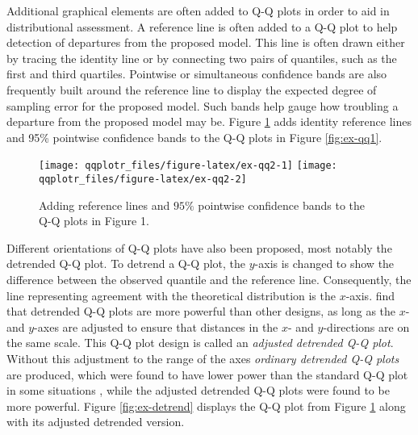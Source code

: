 Additional graphical elements are often added to Q-Q plots in order to
aid in distributional assessment. A reference line is often added to a
Q-Q plot to help detection of departures from the proposed model. This
line is often drawn either by tracing the identity line or by connecting
two pairs of quantiles, such as the first and third quartiles. Pointwise
or simultaneous confidence bands are also frequently built around the
reference line to display the expected degree of sampling error for the
proposed model. Such bands help gauge how troubling a departure from the
proposed model may be. Figure \ref{fig:ex-qq2} adds identity reference
lines and 95\% pointwise confidence bands to the Q-Q plots in Figure
\ref{fig:ex-qq1}.

\begin{Schunk}
\begin{figure}

{\centering \texttt{[image: qqplotr\_files/figure-latex/ex-qq2-1]} \texttt{[image: qqplotr\_files/figure-latex/ex-qq2-2]} 

}

\caption[Adding reference lines and $95\%$ pointwise confidence bands to the Q-Q plots in Figure 1]{Adding reference lines and $95\%$ pointwise confidence bands to the Q-Q plots in Figure 1.}\label{fig:ex-qq2}
\end{figure}
\end{Schunk}

Different orientations of Q-Q plots have also been proposed, most
notably the detrended Q-Q plot. To detrend a Q-Q plot, the \(y\)-axis is
changed to show the difference between the observed quantile and the
reference line. Consequently, the line representing agreement with the
theoretical distribution is the \(x\)-axis. \citet{Loy2016-fg} find that
detrended Q-Q plots are more powerful than other designs, as long as the
\(x\)- and \(y\)-axes are adjusted to ensure that distances in the
\(x\)- and \(y\)-directions are on the same scale. This Q-Q plot design
is called an \emph{adjusted detrended Q-Q plot}. Without this adjustment
to the range of the axes \emph{ordinary detrended Q-Q plots} are
produced, which were found to have lower power than the standard Q-Q
plot in some situations \citep{Loy2016-fg}, while the adjusted detrended
Q-Q plots were found to be more powerful. Figure \ref{fig:ex-detrend}
displays the Q-Q plot from Figure \ref{fig:ex-qq2} along with its
adjusted detrended version.

